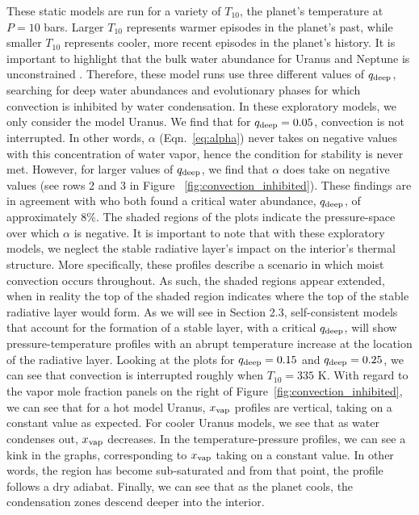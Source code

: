 \documentclass[11pt]{ucscthesisbs}
\begin{document}
These static models are run for a variety of $T_{10}$, the planet's temperature at $P=10$ bars. Larger $T_{10}$ represents warmer episodes in the planet's past, while smaller $T_{10}$ represents cooler, more recent episodes in the planet's history.  It is important to highlight that the bulk water abundance for Uranus and Neptune is unconstrained \citep{guillot_1995}. Therefore, these model runs use three different values of $q_{\rm deep}$, searching for deep water abundances and evolutionary phases for which convection is inhibited by water condensation. In these exploratory models, we only consider the model Uranus. We find that for $q_{\rm deep} = 0.05$, convection is not interrupted. In other words, $\alpha$ (Eqn.~\ref{eq:alpha})  never takes on negative values with this concentration of water vapor, hence the condition for stability is never met. However, for larger values of $q_{\rm deep}$, we find that $\alpha$ does take{} on negative values (see rows 2 and 3 in Figure ~\ref{fig:convection_inhibited}). These findings are in agreement with \citep{friedson_2017,leconte_2017} who both found a critical water abundance, $q_{\rm deep}$, of approximately $8\%$. The shaded regions of the plots indicate the pressure-space over which $\alpha$ is negative. It is important to note that with these exploratory models, we neglect the stable radiative layer's impact on the interior's thermal structure. More specifically, these profiles describe a scenario in which moist convection occurs throughout. As such, the shaded regions appear extended, when in reality the top of the shaded region indicates where the top of the stable radiative layer would form. As we will see in Section 2.3, self-consistent models that account for the formation of a stable layer, with a critical $q_{\rm deep}$, will show pressure-temperature profiles with an abrupt temperature increase at the location of the radiative layer. Looking at the plots for $q_{\rm deep} = 0.15$ and $q_{\rm deep} = 0.25$, we can see that convection is interrupted roughly when $T_{10} = 335$ K. With regard to the vapor mole fraction panels on the right of Figure~\ref{fig:convection_inhibited}, we can see that for a hot model Uranus, $x_{\rm vap}$ profiles are vertical, taking on a constant value as expected. For cooler Uranus models, we see that as water condenses out, $x_{\rm vap}$ decreases. In the temperature-pressure profiles, we can see a kink in the graphs, corresponding to $x_{\rm vap}$ taking on a constant value. In other words, the region has become sub-saturated and from that point, the profile follows a dry adiabat. Finally, we can see that as the planet cools, the condensation zones descend deeper into the interior.
\end{document}
